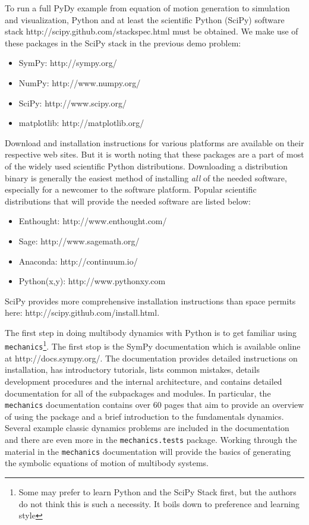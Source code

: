 \documentclass[twocolumn,10pt]{asme2e}
\begin{document}
To run a full PyDy example from equation of motion generation to simulation and
visualization, Python and at least the scientific Python (SciPy) software stack
http://scipy.github.com/stackspec.html must be obtained. We make use of these
packages in the SciPy stack in the previous demo problem:
%
\begin{itemize}
  \item SymPy: http://sympy.org/
  \item NumPy: http://www.numpy.org/
  \item SciPy: http://www.scipy.org/
  \item matplotlib: http://matplotlib.org/
\end{itemize}
%
Download and installation instructions for various platforms are available on
their respective web sites. But it is worth noting that these packages are a
part of most of the widely used scientific Python distributions. Downloading a
distribution binary is generally the easiest method of installing \emph{all} of
the needed software, especially for a newcomer to the software platform.
Popular scientific distributions that will provide the needed software are
listed below:
%
\begin{itemize}
  \item Enthought: http://www.enthought.com/
  \item Sage: http://www.sagemath.org/
  \item Anaconda: http://continuum.io/
  \item Python(x,y): http://www.pythonxy.com
\end{itemize}
%
SciPy provides more comprehensive installation instructions than space permits
here: http://scipy.github.com/install.html.

The first step in doing multibody dynamics with Python is to get familiar using
\verb|mechanics|\footnote{Some may prefer to learn Python and the SciPy Stack
first, but the authors do not think this is such a necessity. It boils down to
preference and learning style}. The first stop is the SymPy documentation which
is available online at http://docs.sympy.org/. The documentation provides
detailed instructions on installation, has introductory tutorials, lists common
mistakes, details development procedures and the internal architecture, and
contains detailed documentation for all of the subpackages and modules. In
particular, the \verb|mechanics| documentation contains over 60 pages that aim
to provide an overview of using the package and a brief introduction to the
fundamentals dynamics. Several example classic dynamics problems are included
in the documentation and there are even more in the \verb|mechanics.tests|
package. Working through the material in the \verb|mechanics| documentation
will provide the basics of generating the symbolic equations of motion of
multibody systems.
\end{document}
